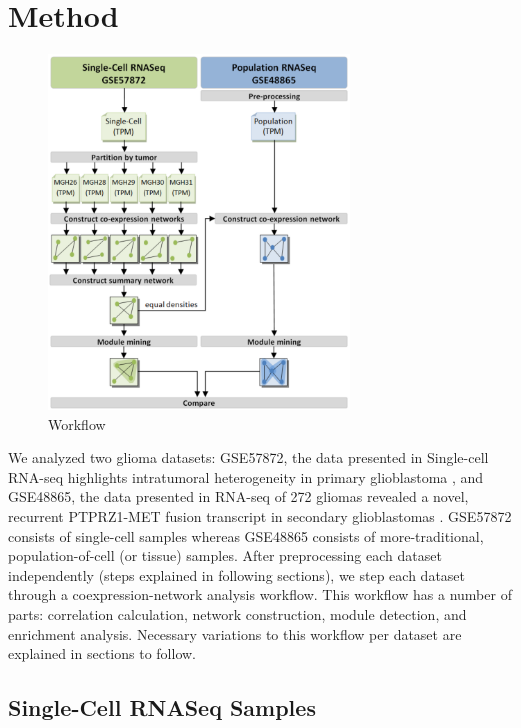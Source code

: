\documentclass[11pt,twoside,a4paper]{article}
\begin{document}
\section{Method}

\begin{figure}[t]
\centering
\includegraphics[width=80mm]{Figures/Workflow}
\caption{Workflow}
\label{Workflow Figure}
\end{figure}

We analyzed two glioma datasets: GSE57872, the data presented in Single-cell RNA-seq highlights intratumoral heterogeneity in primary glioblastoma \cite{Patel}, and GSE48865, the data presented in RNA-seq of 272 gliomas revealed a novel, recurrent PTPRZ1-MET fusion transcript in secondary glioblastomas \cite{Bao}. GSE57872 consists of single-cell samples whereas GSE48865 consists of more-traditional, population-of-cell (or tissue) samples. After preprocessing each dataset independently (steps explained in following sections), we step each dataset through a coexpression-network analysis workflow. This workflow has a number of parts: correlation calculation, network construction, module detection, and enrichment analysis. Necessary variations to this workflow per dataset are explained in sections to follow. 

\subsection{Single-Cell RNASeq Samples }
\end{document}
